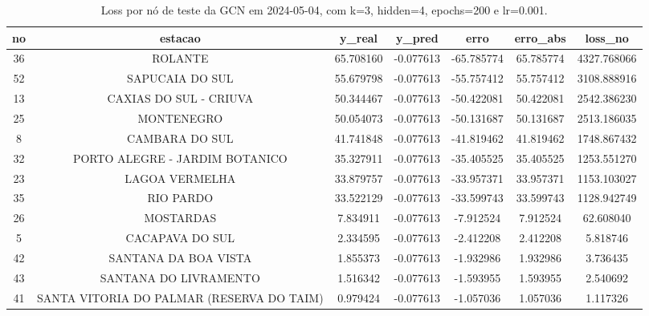 \begin{table}[h]
\centering
\caption{Loss por nó de teste da GCN em 2024-05-04, com k=3, hidden=4, epochs=200 e lr=0.001.}
\label{tab:gcn_loss_nodes_k3_hidden4}
\begin{tabular}{ccccccc}
\toprule
no & estacao & y\_real & y\_pred & erro & erro\_abs & loss\_no \\
\midrule
36 & ROLANTE & 65.708160 & -0.077613 & -65.785774 & 65.785774 & 4327.768066 \\
52 & SAPUCAIA DO SUL & 55.679798 & -0.077613 & -55.757412 & 55.757412 & 3108.888916 \\
13 & CAXIAS DO SUL - CRIUVA & 50.344467 & -0.077613 & -50.422081 & 50.422081 & 2542.386230 \\
25 & MONTENEGRO & 50.054073 & -0.077613 & -50.131687 & 50.131687 & 2513.186035 \\
8 & CAMBARA DO SUL & 41.741848 & -0.077613 & -41.819462 & 41.819462 & 1748.867432 \\
32 & PORTO ALEGRE - JARDIM BOTANICO & 35.327911 & -0.077613 & -35.405525 & 35.405525 & 1253.551270 \\
23 & LAGOA VERMELHA & 33.879757 & -0.077613 & -33.957371 & 33.957371 & 1153.103027 \\
35 & RIO PARDO & 33.522129 & -0.077613 & -33.599743 & 33.599743 & 1128.942749 \\
26 & MOSTARDAS & 7.834911 & -0.077613 & -7.912524 & 7.912524 & 62.608040 \\
5 & CACAPAVA DO SUL & 2.334595 & -0.077613 & -2.412208 & 2.412208 & 5.818746 \\
42 & SANTANA DA BOA VISTA & 1.855373 & -0.077613 & -1.932986 & 1.932986 & 3.736435 \\
43 & SANTANA DO LIVRAMENTO & 1.516342 & -0.077613 & -1.593955 & 1.593955 & 2.540692 \\
41 & SANTA VITORIA DO PALMAR (RESERVA DO TAIM) & 0.979424 & -0.077613 & -1.057036 & 1.057036 & 1.117326 \\
\bottomrule
\end{tabular}
\end{table}
